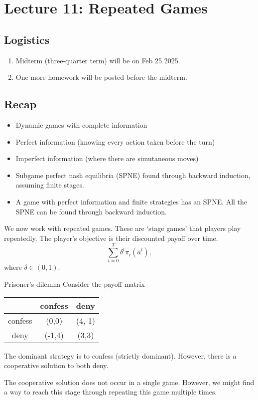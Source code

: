 \section{Lecture 11: Repeated Games}
\newsection
\subsection*{Logistics}
\begin{enumerate}
    \item Midterm (three-quarter term) will be on Feb 25 2025.
    \item One more homework will be posted before the midterm.
\end{enumerate}
\subsection*{Recap}
\begin{itemize}
    \item Dynamic games with complete information
    \item Perfect information (knowing every action taken before the turn)
    \item Imperfect information (where there are simutaneous moves)
    \item Subgame perfect nash equilibria (SPNE) found through backward induction, assuming finite stages.
    \item A game with perfect information and finite strategies has an SPNE. All the SPNE can be found through backward induction.
\end{itemize}


We now work with repeated games. These are `stage games' that players play repeatedly. The player's objective is their discounted payoff over time.
\[
\sum_{t=0}^T \delta^t \pi_i(\bar{a}^t),\]
where $\delta \in (0,1)$.
\begin{aexample}{Prisoner's dilemna}{}
    Consider the payoff matrix \begin{center}
        \begin{tabular}{|c|c c|}
            \hline & confess & deny \\
            \hline 
            confess & (0,0) & (4,-1)\\
            \hline
            deny & (-1,4) & (3,3)\\\hline
        \end{tabular}
    \end{center}
    The dominant strategy is to confess (strictly dominant). However, there is a cooperative solution to both deny.
\end{aexample}
The cooperative solution does not occur in a single game. However, we might find a way to reach this stage through repeating this game multiple times. 


